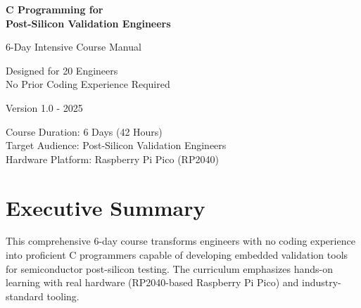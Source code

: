 \documentclass[11pt,a4paper]{article}
\begin{document}
\begin{titlepage}
    \centering
    \vspace*{2cm}

    {\Huge\bfseries C Programming for\\Post-Silicon Validation Engineers\par}
    \vspace{1cm}
    {\Large 6-Day Intensive Course Manual\par}
    \vspace{2cm}


    \vspace{2cm}
    {\large Designed for 20 Engineers\\No Prior Coding Experience Required\par}
    \vspace{1cm}
    {\large Version 1.0 - 2025\par}

    \vfill

    {\large Course Duration: 6 Days (42 Hours)\\
    Target Audience: Post-Silicon Validation Engineers\\
    Hardware Platform: Raspberry Pi Pico (RP2040)\par}
\end{titlepage}

\newpage
\tableofcontents
\newpage

\section{Executive Summary}

This comprehensive 6-day course transforms engineers with no coding experience into proficient C programmers capable of developing embedded validation tools for semiconductor post-silicon testing. The curriculum emphasizes hands-on learning with real hardware (RP2040-based Raspberry Pi Pico) and industry-standard tooling.
\end{document}
